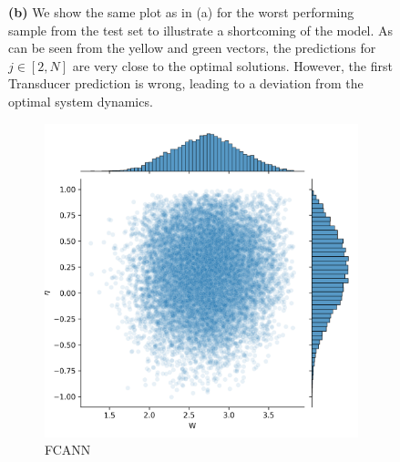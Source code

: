 \begin{figure}
{	\textbf{(b)} We show the same plot as in (a) for the worst performing sample from the test set to illustrate a shortcoming of the model. As can be seen from the yellow and green vectors, the predictions for $j \in [2, N]$ are very close to the optimal solutions. However, the first Transducer prediction is wrong, leading to a deviation from the optimal system dynamics.}
\end{figure}

\begin{figure}
	\centering
	\begin{subfigure}{0.32\textwidth}
		\centering
		\includegraphics[width=\textwidth]{img/work_dist_n5_eigen_ann}
		\caption{FCANN}
		\label{}
	\end{subfigure}
	\begin{subfigure}{0.32\textwidth}
		\centering

\end{subfigure}
\end{figure}
